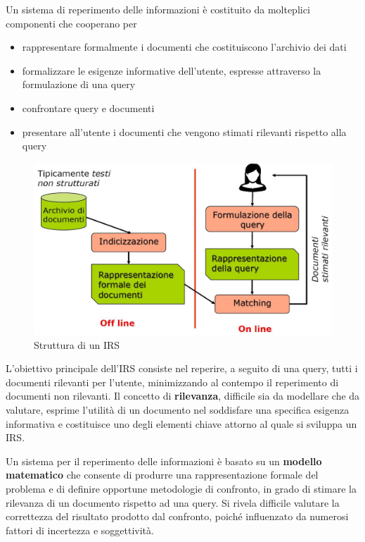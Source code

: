 Un sistema di reperimento delle informazioni è costituito da molteplici componenti che cooperano per

\begin{itemize}
\item rappresentare formalmente i documenti che costituiscono l’archivio dei dati
\item formalizzare le esigenze informative dell’utente, espresse attraverso la formulazione di una query
\item confrontare query e documenti
\item presentare all’utente i documenti che vengono stimati rilevanti rispetto alla query
\end{itemize}

\begin{figure}[H]
	\centering
	\includegraphics[scale=0.7]{../images/01_1_struttura_IRS}
	\caption[Struttura di un IRS]{Struttura di un IRS}
	\label{fig:strutturaIRS}
\end{figure}

L’obiettivo principale dell'IRS consiste nel reperire, a seguito di una query, tutti i documenti rilevanti per l’utente, minimizzando al contempo il reperimento di documenti non rilevanti. Il concetto di \textbf{rilevanza}, difficile sia da modellare che da valutare, esprime l’utilità di un documento nel soddisfare una specifica esigenza informativa e costituisce uno degli elementi chiave attorno al quale si sviluppa un IRS.

Un sistema per il reperimento delle informazioni è basato su un \textbf{modello matematico} che consente di produrre una rappresentazione formale del problema e di definire opportune metodologie di confronto, in grado di stimare la rilevanza di un documento rispetto ad una query. Si rivela difficile valutare la correttezza del risultato prodotto dal confronto, poiché influenzato da numerosi fattori di incertezza e soggettività.

